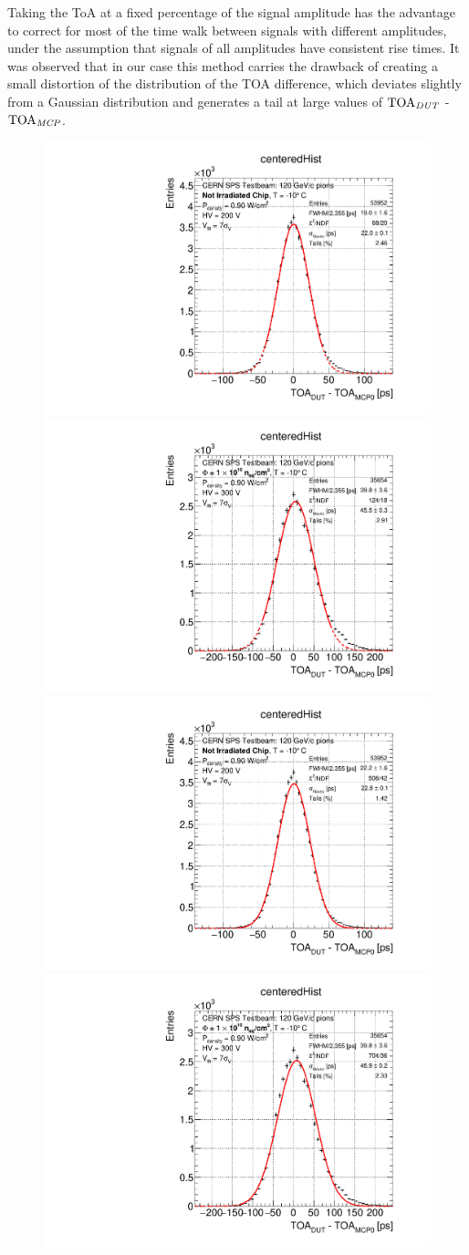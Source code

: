 		Taking the ToA at a fixed percentage of the signal amplitude has the advantage to correct for most of the time walk between signals with different amplitudes, under the assumption that signals of all amplitudes have consistent rise times. 
		It was observed that in our case this method carries the drawback of creating a small distortion of the distribution of the TOA difference, which deviates slightly from a Gaussian distribution and generates a tail at large values of ${\rm TOA}_{\it DUT}$ - ${\rm TOA}_{\it MCP}$.
		\begin{figure}[h]
			\centering 
			\includegraphics[width=.49\textwidth]{files/MONOLITH_Irradiated_paper/M06_fit20.pdf}
			\includegraphics[width=.49\textwidth]{files/MONOLITH_Irradiated_paper/M16_300V_fit20.pdf}
			\includegraphics[width=.49\textwidth]{files/MONOLITH_Irradiated_paper/M06_fullfit.pdf}
			\includegraphics[width=.49\textwidth]{files/MONOLITH_Irradiated_paper/M16_300V_fullfit.pdf}

\end{figure}
